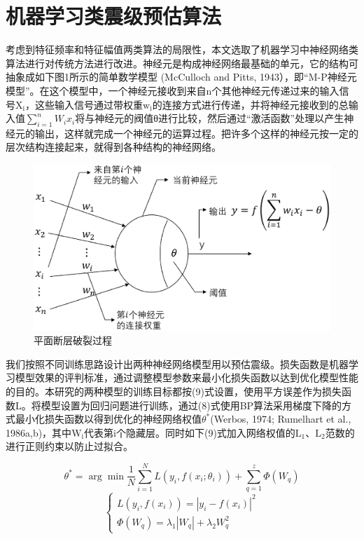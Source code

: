 
\chapter{机器学习类震级预估算法}

\indent 考虑到特征频率和特征幅值两类算法的局限性，本文选取了机器学习中神经网络类算法进行对传统方法进行改进。神经元是构成神经网络最基础的单元，它的结构可抽象成如下图1所示的简单数学模型 (McCulloch and Pitts, 1943），即“M-P神经元模型”。在这个模型中，一个神经元接收到来自n个其他神经元传递过来的输入信号$\mathrm{X}_{\mathrm{i}}$，这些输入信号通过带权重$\mathrm{w}_{\mathrm{i}}$的连接方式进行传递，并将神经元接收到的总输入值$\sum_{i=1}^{n} W_{i} x_{i}$将与神经元的阀值θ进行比较，然后通过“激活函数”处理以产生神经元的输出，这样就完成一个神经元的运算过程。把许多个这样的神经元按一定的层次结构连接起来，就得到各种结构的神经网络。
    
\begin{figure}[!h]
\centerin
\includegraphics[width=0.99\linewidth]{img/mp.eps}
\caption{ 平面断层破裂过程} \label{fig:rupture-process}
\end{figure}

\indent 我们按照不同训练思路设计出两种神经网络模型用以预估震级。损失函数是机器学习模型效果的评判标准，通过调整模型参数来最小化损失函数以达到优化模型性能的目的。本研究的两种模型的训练目标都按(9)式设置，使用平方误差作为损失函数L。将模型设置为回归问题进行训练，通过(8)式使用BP算法采用梯度下降的方式最小化损失函数以得到优化的神经网络权值$\theta^{*}$(Werbos, 1974; Rumelhart et al., 1986a,b)，其中$\mathrm{W}_{\mathrm{i}}$代表第i个隐藏层。同时如下(9)式加入网络权值的$\mathrm{L}_{1}$、$\mathrm{L}_{2}$范数的进行正则约束以防止过拟合。

\begin{equation}
\theta^{*}=\arg \min \frac{1}{N} \sum_{i=1}^{N} L\left(y_{i}, f\left(x_{i} ; \theta_{i}\right)\right)+\sum_{q=1}^{z} \Phi\left(W_{q}\right)
\end{equation}
\begin{equation}
\left\{\begin{array}{c}{L\left(y_{i}, f\left(x_{i}\right)\right)=\left|y_{i}-f\left(x_{i}\right)\right|^{2}} \\ {\Phi\left(W_{q}\right)=\lambda_{1}\left|W_{q}\right|+\lambda_{2} W_{q}^{2}}\end{array}\right.
\end{equation}

